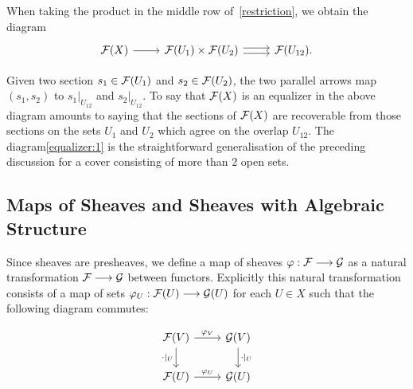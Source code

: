 When taking the product in the middle row of~\ref{restriction}, we obtain the diagram 
\[
	\begin{tikzcd}
		{\Sh{F}(X)} & {\Sh{F}(U_1)\times\Sh{F}(U_2)} & {\Sh{F}(U_{12})}.
		\arrow[from=1-1, to=1-2]
		\arrow[shift right=1, from=1-2, to=1-3]
		\arrow[shift left=1, from=1-2, to=1-3]
	\end{tikzcd}
\]

Given two section $s_1 \in \mathcal{F}(U_1)$ and $s_2 \in \mathcal{F}(U_2)$, the two parallel arrows map $(s_1, s_2)$ to $s_1|_{U_{12}}$ and $s_2|_{U_{12}}$. To say that $\mathcal{F}(X)$ is an equalizer in the above diagram amounts to saying that the sections of $\mathcal{F}(X)$ are recoverable from those sections on the sets $U_1$ and $U_2$ which agree on the overlap $U_{12}$. The diagram\eqref{equalizer:1} is the straightforward generalisation of the preceding discussion for a cover consisting of more than 2 open sets.

\subsection{Maps of Sheaves and Sheaves with Algebraic Structure}
Since sheaves are presheaves, we define a map of sheaves $\varphi: \mathcal{F} \longrightarrow \mathcal{G}$ as a natural transformation $\mathcal{F} \longrightarrow \mathcal{G}$ between functors. Explicitly this natural transformation consists of a map of sets $\varphi_U: \mathcal{F}(U) \longrightarrow \mathcal{G}(U)$ for each $U \in X$ such that the following diagram commutes:

\[
	\begin{tikzcd}
		{\Sh{F}(V)} & {\Sh{G}(V)} \\
		{\Sh{F}(U)} & {\Sh{G}(U)}
		\arrow["{\cdot|_U}"', from=1-1, to=2-1]
		\arrow["{\varphi_V}", from=1-1, to=1-2]
		\arrow["{\cdot|_U}", from=1-2, to=2-2]
		\arrow["{\varphi_U}", from=2-1, to=2-2]
	\end{tikzcd}
\]

